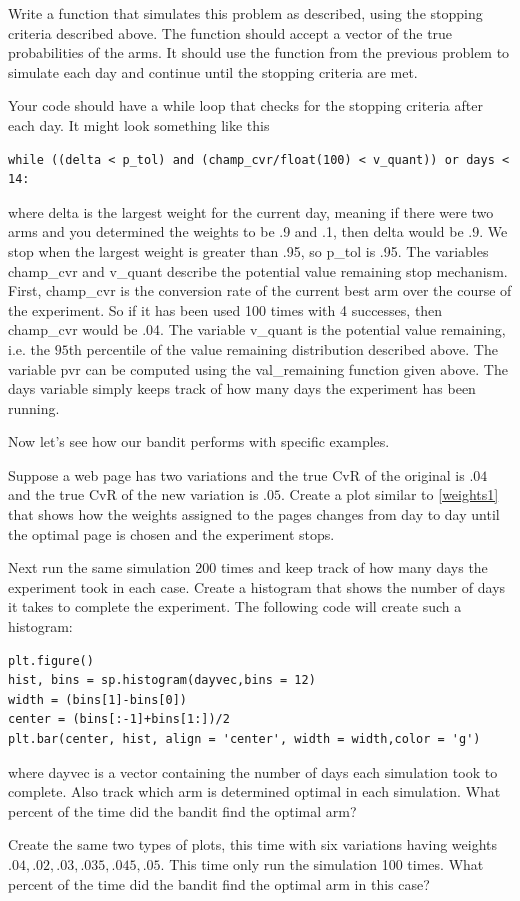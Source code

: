\begin{problem}
Write a function that simulates this problem as described, using the stopping criteria described above.  The function should accept a vector of the true probabilities of the arms.  It should use the function from the previous problem to simulate each day and continue until the stopping criteria are met.

Your code should have a while loop that checks for the stopping criteria after each day.  It might look something like this
\newpage
\begin{lstlisting}[style = python]
while ((delta < p_tol) and (champ_cvr/float(100) < v_quant)) or days < 14:
\end{lstlisting}
where delta is the largest weight for the current day, meaning if there were two arms and you determined the weights to be .9 and .1, then delta would be .9.  We stop when the largest weight is greater than .95, so p\_tol is .95.  The variables champ\_cvr and v\_quant describe the potential value remaining stop mechanism.  First, champ\_cvr is the conversion rate of the current best arm over the course of the experiment.  So if it has been used 100 times with 4 successes, then champ\_cvr would be .04.  The variable v\_quant is the potential value remaining, i.e. the $95$th percentile of the value remaining distribution described above.  The variable pvr can be computed using the val\_remaining function given above.
The days variable simply keeps track of how many days the experiment has been running.
\end{problem}

Now let's see how our bandit performs with specific examples.

\begin{problem}
Suppose a web page has two variations and the true CvR of the original is $.04$ and the true CvR of the new variation is $.05$.  Create a plot similar to \ref{weights1} that shows how the weights assigned to the pages changes from day to day until the optimal page is chosen and the experiment stops.

Next run the same simulation 200 times and keep track of how many days the experiment took in each case.  Create a histogram that shows the number of days it takes to complete the experiment.  The following code will create such a histogram:

\begin{lstlisting}[style = python]
plt.figure()
hist, bins = sp.histogram(dayvec,bins = 12)
width = (bins[1]-bins[0])
center = (bins[:-1]+bins[1:])/2
plt.bar(center, hist, align = 'center', width = width,color = 'g')
\end{lstlisting}
where dayvec is a vector containing the number of days each simulation took to complete.  Also track which arm is determined optimal in each simulation.  What percent of the time did the bandit find the optimal arm?

Create the same two types of plots, this time with six variations having weights $.04,.02,.03,.035,.045,.05$.  This time only run the simulation 100 times.  What percent of the time did the bandit find the optimal arm in this case?
\end{problem}

